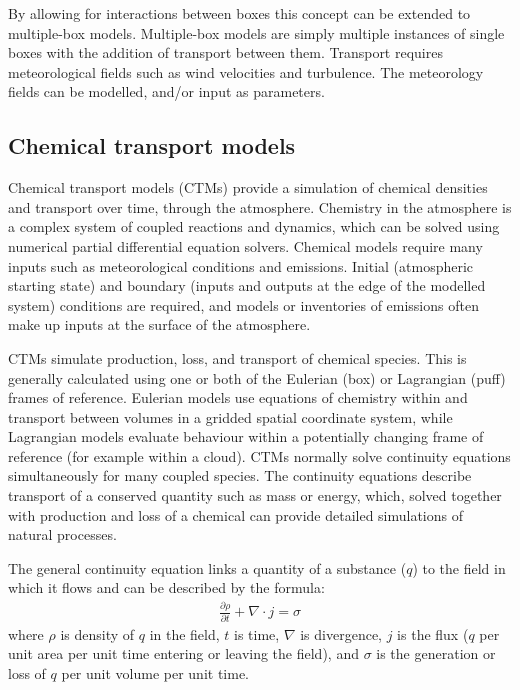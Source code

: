     By allowing for interactions between boxes this concept can be extended to multiple-box models.
    Multiple-box models are simply multiple instances of single boxes with the addition of transport between them.
    Transport requires meteorological fields such as wind velocities and turbulence.
    The meteorology fields can be modelled, and/or input as parameters.
  
  
  \subsection{Chemical transport models}
    \label{LR:Models:ctm}
    Chemical transport models (CTMs) provide a simulation of chemical densities and transport over time, through the atmosphere.
    Chemistry in the atmosphere is a complex system of coupled reactions and dynamics, which can be solved using numerical partial differential equation solvers.
    Chemical models require many inputs such as meteorological conditions and emissions.
    Initial (atmospheric starting state) and boundary (inputs and outputs at the edge of the modelled system) conditions are required, and models or inventories of emissions often make up inputs at the surface of the atmosphere.
    
    
    CTMs simulate production, loss, and transport of chemical species.
    This is generally calculated using one or both of the Eulerian (box) or Lagrangian (puff) frames of reference.
    Eulerian models use equations of chemistry within and transport between volumes in a gridded spatial coordinate system, while Lagrangian models evaluate behaviour within a potentially changing frame of reference (for example within a cloud).
    CTMs normally solve continuity equations simultaneously for many coupled species.
    The continuity equations describe transport of a conserved quantity such as mass or energy, which, solved together with production and loss of a chemical can provide detailed simulations of natural processes.
    
    The general continuity equation links a quantity of a substance ($q$) to the field in which it flows and can be described by the formula:
    \begin{align*}
      \frac{\partial \rho}{\partial t} + \nabla \cdot j = \sigma 
    \end{align*}
    where $\rho$ is density of $q$ in the field, $t$ is time, $\nabla$ is divergence, $j$ is the flux ($q$ per unit area per unit time entering or leaving the field), and $\sigma$ is the generation or loss of $q$ per unit volume per unit time.
    
